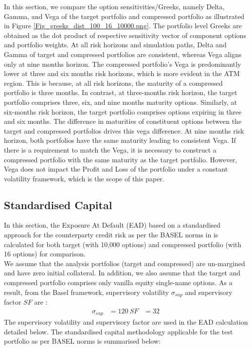 \noindent In this section, we compare the option sensitivities/Greeks, namely Delta, Gamma, and Vega of the target portfolio and compressed portfolio as illustrated in Figure \ref{Fig_greeks_dist_100_16_10000.png}. The portfolio level Greeks are obtained as the dot product of respective sensitivity vector of component options and portfolio weights. At all risk horizons and simulation paths, Delta and Gamma of target and compressed portfolios are consistent, whereas Vega aligns only at nine months horizon. The compressed portfolio's Vega is predominantly lower at three and six months risk horizons, which is more evident in the ATM region. This is because, at all risk horizons, the maturity of a compressed portfolio is three months. In contrast, at three-months risk horizon, the target portfolio comprises three, six, and nine months maturity options. Similarly, at six-months risk horizon, the target portfolio comprises options expiring in three and six months. The difference in maturities of constituent options between the target and compressed portfolios drives this vega difference. At nine months risk horizon, both portfolios have the same maturity leading to consistent Vega. If there is a requirement to match the Vega, it is necessary to construct a compressed portfolio with the same maturity as the target portfolio. However, Vega does not impact the Profit and Loss of the portfolio under a constant volatility framework, which is the scope of this paper.


\subsection{Standardised Capital}
\label{Standardised Capital}

In this section, the Exposure At Default (EAD) based on a standardised approach for the counterparty credit risk as per the BASEL norms in \cite{biscre52} is calculated for both target (with 10,000 options) and compressed portfolio (with 16 options) for comparison. \\

\noindent We assume that the analysis portfolios (target and compressed) are un-margined and have zero initial collateral. In addition, we also assume that the target and compressed portfolio comprises only vanilla equity single-name options. As a result, from the Basel framework, supervisory volatility $\sigma_{sup}$ and supervisory factor $SF$ are : 
\begin{align*}
 \sigma_{sup} &= 120\  SF &= 32\ \end{align*}
The supervisory volatility and supervisory factor are used in the EAD calculation detailed below. The standardised capital methodology applicable for the test portfolio as per BASEL norms is summarised below:

